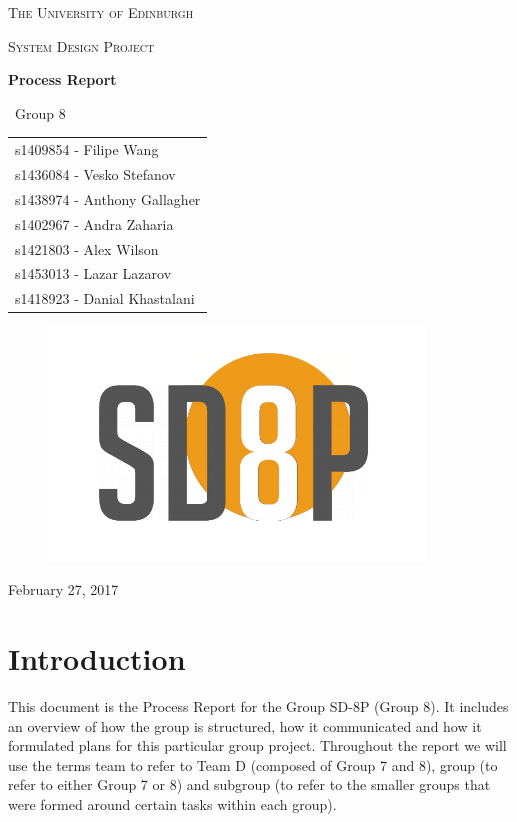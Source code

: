 \documentclass[a4paper,12pt]{article}
\begin{document}
\begin{titlepage}
	\centering
	{\scshape\LARGE The University of Edinburgh \par}
	\vspace{1cm}
	{\scshape\Large System Design Project\par}
	\vspace{1.5cm}
	{\huge\bfseries Process Report\par}
	\vspace{2cm}
	{\Large\ Group 8\par}
	\vfill
	\begin{tabular}[t]{l}
	s1409854  - Filipe Wang \\
	s1436084  - Vesko Stefanov \\
	s1438974  - Anthony Gallagher \\
	s1402967  - Andra Zaharia \\
	s1421803  - Alex Wilson \\
	s1453013  - Lazar Lazarov \\
	s1418923  - Danial Khastalani
	\end{tabular}
	\vfill
\begin{figure}[H]
    \centering
    \includegraphics[width=10cm]{sd8plogo}
    \label{fig:robot}
\end{figure}
	\vfill

	{\large February 27, 2017\par}
\end{titlepage}

\section{Introduction}
This document is the Process Report for the Group SD-8P (Group 8). It includes an overview of how the group is structured, how it communicated and how it formulated plans for this particular group project. Throughout the report we will use the terms team to refer to Team D (composed of Group 7 and 8), group (to refer to either Group 7 or 8) and subgroup (to refer to the smaller groups that were formed around certain tasks within each group).
\end{document}
